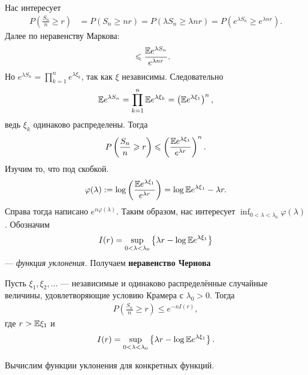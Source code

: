 \documentclass[../main.tex]{subfiles}
\begin{document}
Нас интересует
\begin{align*}
 P \left( \frac{S_n}{n} \geqslant r \right) &= P ( S_n \geqslant nr) = P (\lambda S_n \geqslant \lambda n r) = P(e^{\lambda S_n} \geqslant e^{\lambda n r}).
\end{align*} Далее по неравенству Маркова:
\begin{align*}
 &\leqslant \frac{\mathbb E e^{\lambda S_n}}{e^{\lambda n r}}.
\end{align*} Но $ e^{\lambda S_n} = \prod_{k=1}^{n}e^{\lambda \xi_k}  $, так как $ \xi $ независимы. Следовательно
\begin{align*}
 \mathbb E e^{\lambda S_n} = \prod_{k=1}^{n} \mathbb E e^{\lambda \xi_k} = \left( \mathbb E e^{\lambda \xi_1} \right)^{n},
\end{align*} ведь $ \xi_k $ одинаково распределены. Тогда
\begin{align*}
 P\left(\frac{S_n}{n}\geqslant r\right)\leqslant \left( \frac{\mathbb E e ^{\lambda \xi_1}}{e^{\lambda r}} \right)^{n}.
\end{align*} Изучим то, что под скобкой.
\begin{align*}
 \varphi(\lambda) := \log \left( \frac{\mathbb E e^{\lambda \xi_1}}{e^{\lambda r}} \right) = \log \mathbb E e^{\lambda \xi_1} - \lambda r.
\end{align*} Справа тогда написано $ e^{n\varphi(\lambda)} $. Таким образом, нас интересует $ \inf_{0 < \lambda < \lambda_0} \varphi(\lambda) $. Обозначим
\begin{align*}
 I(r) =  \sup_{0 < \lambda < \lambda_0} \left\{ \lambda r - \log \mathbb E e^{\lambda \xi_1} \right\}
\end{align*} --- \textit{функция уклонения.} Получаем \textbf{неравенство Чернова}
\begin{prop}
 Пусть $ \xi_1, \xi_2, \ldots $ --- независимые и одинаково распределённые случайные величины, удовлетворяющие условию Крамера с $ \lambda_0 > 0 $. Тогда
 \begin{align*}
  P \left( \frac{S_n}{n} \geqslant r \right) \leqslant e^{-nI(r)},
 \end{align*} где $ r > \mathbb E \xi_1 $ и
 \begin{align*}
  I(r) = \sup_{0 < \lambda < \lambda_0} \left\{ \lambda r - \log \mathbb E e^{\lambda\xi_1}  \right\}.
 \end{align*}
\end{prop}

Вычислим функции уклонения для конкретных функций.
\end{document}
